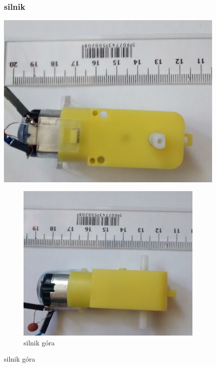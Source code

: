 \documentclass[a4paper,11pt]{article}
\def\SCALE{0.6}
\begin{document}
\begin{figure}[H]
	\subsubsection{silnik}
	\centering
	\includegraphics[width=\SCALE
	\paperwidth]{silnik-bok}
	\caption{silnik bok}

	\begin{figure}[H]
		\centering
		\includegraphics[width=\SCALE
		\paperwidth]{silnik-gora}
		\caption{silnik góra}
	\end{figure}

\end{figure}
\end{document}
